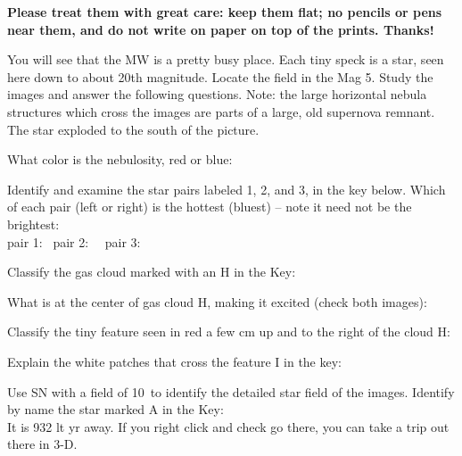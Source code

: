 \medskip
\noindent
{\bf Please treat them with great care: keep them flat; no pencils or
  pens near them, and do not write on paper on top of the
  prints. Thanks!}

\medskip
\noindent
You will see that the MW is a pretty busy place. Each tiny speck is a
star, seen here down to about 20th magnitude. Locate the field in the
Mag 5. Study the images and answer the following questions. Note: the
large horizontal nebula structures which cross the images are parts of
a large, old supernova remnant. The star exploded to the south of the
picture.


\bigskip
\noindent
What color is the nebulosity, red or blue: \makebox[4cm]{\hrulefill}

\bigskip
\noindent
Identify and examine the star pairs labeled 1, 2, and 3, in the key
below.
Which of each pair (left or right) is the hottest (bluest) -- note it need not be the
brightest: \\
pair 1: \makebox[4cm]{\hrulefill} \  pair 2: \makebox[4cm]{\hrulefill}
\ \
pair 3:  \makebox[4cm]{\hrulefill}

\bigskip
\noindent
Classify the gas cloud marked with an H in the Key:  \makebox[4cm]{\hrulefill}

\bigskip
\noindent
What is at the center of gas cloud H, making it excited (check both images): 
\makebox[4cm]{\hrulefill}

\bigskip
\noindent
Classify the tiny feature seen in red a few cm up and to the right of
the cloud H:   \makebox[4cm]{\hrulefill}

\bigskip
\noindent
Explain the white patches that cross the feature I in the key: \makebox[4cm]{\hrulefill}


\bigskip
\noindent
Use SN with a field of 10\deg\ to identify the detailed star field of the
images.  Identify by name the star marked A in the Key:
\makebox[4cm]{\hrulefill} \\
It is 932 lt yr away. If you right click and check go there,
you can take a trip out there in 3-D.


\begin{figure*}[h]
        \centerline{}
        \caption{}
         \end{figure*}




